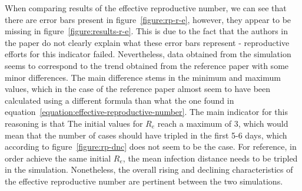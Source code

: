 \documentclass[a4paper]{article}
\begin{document}
\par
When comparing results of the effective reproductive number, we can see that there are error bars present in figure~\ref{figure:rp-r-e}, however, they appear to be missing in figure~\ref{figure:results-r-e}. This is due to the fact that the authors in the paper do not clearly explain what these error bars represent - reproductive efforts for this indicator failed. Nevertheless, data obtained from the simulation seems to correspond to the trend obtained from the reference paper \cite{Maltezos2021} with some minor differences. The main difference stems in the minimum and maximum values, which in the case of the reference paper \cite{Maltezos2021} almost seem to have been calculated using a different formula than what the one found in equation~\ref{equation:effective-reproductive-number}. The main indicator for this reasoning is that The initial values for $R_e$ reach a maximum of 3, which would mean that the number of cases should have tripled in the first 5-6 days, which according to figure~\ref{figure:rp-dnc} does not seem to be the case. For reference, in order achieve the same initial $R_e$, the mean infection distance needs to be tripled in the simulation. Nonetheless, the overall rising and declining characteristics of the effective reproductive number are pertinent between the two simulations.
\end{document}
